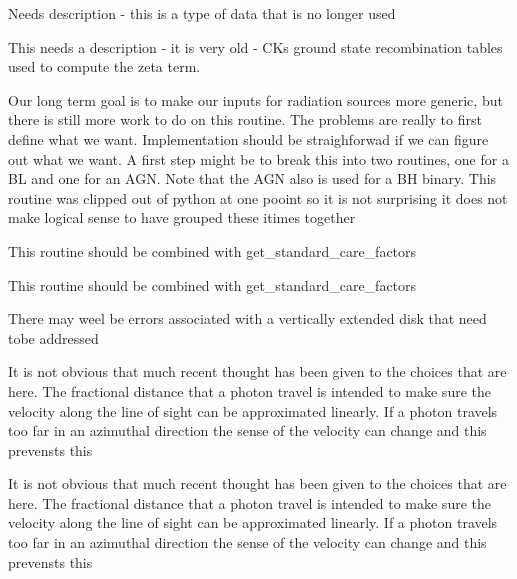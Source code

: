 \begin{DoxyRefList}
Needs description -\/ this is a type of data that is no longer used 

This needs a description -\/ it is very old -\/ CK\textquotesingle{}s ground state recombination tables used to compute the zeta term.  
\item[\label{bug__bug000058}%
\Hypertarget{bug__bug000058}%
Global \hyperlink{templates_8h_a897e0ae97c32a481075df9fc45f6e745}{get\+\_\+bl\+\_\+and\+\_\+agn\+\_\+params} (double lstar)]Our long term goal is to make our inputs for radiation sources more generic, but there is still more work to do on this routine. The problems are really to first define what we want. Implementation should be straighforwad if we can figure out what we want. A first step might be to break this into two routines, one for a BL and one for an A\+GN. Note that the A\+GN also is used for a BH binary. This routine was clipped out of python at one pooint so it is not surprising it does not make logical sense to have grouped these itimes together 
\item[\label{bug__bug000018}%
\Hypertarget{bug__bug000018}%
Global \hyperlink{templates_8h_a4ba7a23129d489314ba51c999d18e321}{get\+\_\+extra\+\_\+diagnostics} (void)]This routine should be combined with get\+\_\+standard\+\_\+care\+\_\+factors 
\item[\label{bug__bug000018}%
\Hypertarget{bug__bug000018}%
Global \hyperlink{templates_8h_a4ba7a23129d489314ba51c999d18e321}{get\+\_\+extra\+\_\+diagnostics} (void)]This routine should be combined with get\+\_\+standard\+\_\+care\+\_\+factors 
\item[\label{bug__bug000034}%
\Hypertarget{bug__bug000034}%
Global \hyperlink{templates_8h_abc35742eeeb50cc9cda997c3de567f20}{get\+\_\+knigge\+\_\+wind\+\_\+params} (int ndom)]There may weel be errors associated with a vertically extended disk that need tobe addressed 
\item[\label{bug__bug000017}%
\Hypertarget{bug__bug000017}%
Global \hyperlink{templates_8h_a3c32de99bd46282a95c0de7c8f7e890f}{get\+\_\+standard\+\_\+care\+\_\+factors} (void)]It is not obvious that much recent thought has been given to the choices that are here. The fractional distance that a photon travel is intended to make sure the velocity along the line of sight can be approximated linearly. If a photon travels too far in an azimuthal direction the sense of the velocity can change and this prevensts this 
\item[\label{bug__bug000017}%
\Hypertarget{bug__bug000017}%
Global \hyperlink{templates_8h_a3c32de99bd46282a95c0de7c8f7e890f}{get\+\_\+standard\+\_\+care\+\_\+factors} (void)]It is not obvious that much recent thought has been given to the choices that are here. The fractional distance that a photon travel is intended to make sure the velocity along the line of sight can be approximated linearly. If a photon travels too far in an azimuthal direction the sense of the velocity can change and this prevensts this 

\end{DoxyRefList}
